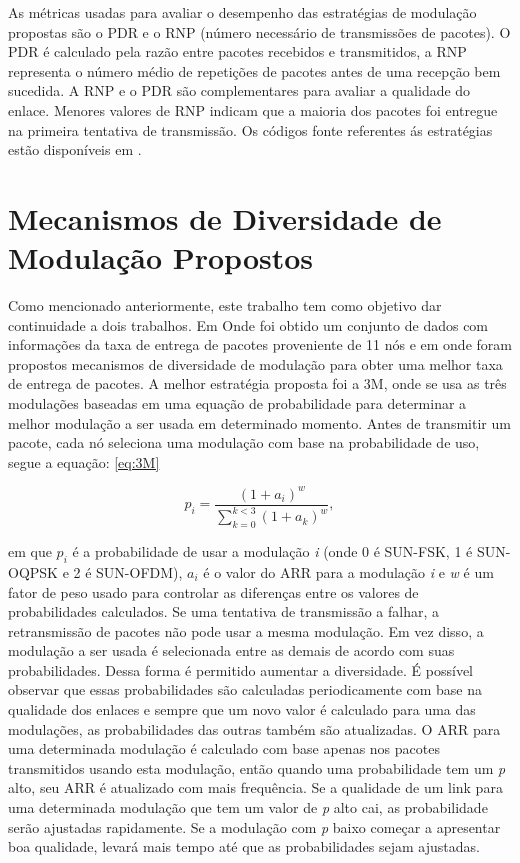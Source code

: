 As métricas usadas para avaliar o desempenho das estratégias de modulação propostas são o PDR e o RNP (número necessário de transmissões de pacotes). O PDR é calculado pela razão entre pacotes recebidos e transmitidos, a RNP representa o número médio de repetições de pacotes antes de uma recepção bem sucedida. A RNP e o PDR são complementares para avaliar a qualidade do enlace. Menores valores de RNP indicam que a maioria dos pacotes foi entregue na primeira tentativa de transmissão. Os códigos fonte referentes ás estratégias estão disponíveis em \cite{gitGcompi}.

\chapter{Mecanismos de Diversidade de Modulação Propostos}
\label{sec:mecanismos}

Como mencionado anteriormente, este trabalho tem como objetivo dar continuidade a dois trabalhos. Em \cite{tuset2020evaluating} Onde foi obtido um conjunto de dados com informações da taxa de entrega de pacotes proveniente de 11 nós e em \cite{gomes2020improving} onde foram propostos mecanismos de diversidade de modulação para obter uma melhor taxa de entrega de pacotes. A melhor estratégia proposta foi a 3M, onde se usa as três modulações baseadas em uma equação de probabilidade para determinar a melhor modulação a ser usada em determinado momento. Antes de transmitir um pacote, cada nó seleciona uma modulação com base na probabilidade de uso, segue a equação: \ref{eq:3M}

\begin{equation}
\label{eq:3M}
p_i = \frac{{(1+a_i)}^w}{\sum_{k=0}^{k<3}{(1+a_k)}^w},
\end{equation}

em que $p_i$ é a probabilidade de usar a modulação \textit{i} (onde 0 é SUN-FSK, 1 é SUN-OQPSK e 2 é SUN-OFDM), $a_i$ é o valor do ARR para a modulação \textit{i} e \textit{w} é um fator de peso usado para controlar as diferenças entre os valores de probabilidades calculados. Se uma tentativa de transmissão a falhar, a retransmissão de pacotes não pode usar a mesma modulação. Em vez disso, a modulação a ser usada é selecionada entre as demais de acordo com suas probabilidades. Dessa forma é permitido aumentar a diversidade. É possível observar que essas probabilidades são calculadas periodicamente com base na qualidade dos enlaces e sempre que um novo valor é calculado para uma das modulações, as probabilidades das outras também são atualizadas. O ARR para uma determinada modulação é calculado com base apenas nos pacotes transmitidos usando esta modulação, então quando uma probabilidade tem um \textit{p} alto, seu ARR é atualizado com mais frequência. Se a qualidade de um link para uma determinada modulação que tem um valor de \textit{p} alto  cai, as probabilidade serão ajustadas rapidamente. Se a modulação com \textit{p} baixo começar a apresentar boa qualidade, levará mais tempo até que as probabilidades sejam ajustadas. 

